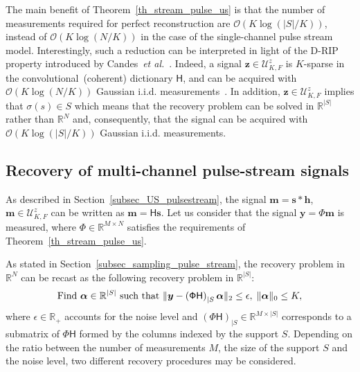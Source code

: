\documentclass{article}
\newcommand{\etal}{\textit{et al.}}
\newcommand{\vect}[1]{\bm{#1}}
\newcommand{\mat}[1]{\mathsf{#1}}
\theoremstyle{definition}
\begin{document}
The main benefit of Theorem~\ref{th_stream_pulse_us} is that the number of measurements required for perfect reconstruction are $\mathcal{O}\left(K \log \left(|S|/K\right)\right)$, instead of $\mathcal{O}\left(K \log \left(N/K\right)\right)$ in the case of the single-channel pulse stream model.
Interestingly, such a reduction can be interpreted in light of the D-RIP property introduced by Candes~\etal{}~\cite{candes11}. 
Indeed, a signal $\vect{z} \in \mathcal{U}^z_{K,F}$ is $K$-sparse in the convolutional~(coherent) dictionary $\mat{H}$, and can be acquired with $\mathcal{O} \left(K \log \left(N / K\right)\right)$ Gaussian i.i.d. measurements~\cite{candes11}. 
In addition, $\vect{z} \in \mathcal{U}^z_{K,F}$ implies that $\sigma \left(s\right) \in S$ which means that the recovery problem can be solved in $\mathbb{R}^{|S|}$ rather than $\mathbb{R}^N$ and, consequently, that the signal can be acquired with $\mathcal{O} \left(K \log \left(|S| / K\right)\right)$ Gaussian i.i.d. measurements. 

\subsection{Recovery of multi-channel pulse-stream signals}
\label{subsec_recovery_pulse_stream}
As described in Section~\ref{subsec_US_pulsestream}, the signal $\vect{m} = \vect{s} \ast \vect{h}$, $\vect{m} \in \mathcal{U}^z_{K,F}$ can be written as $\vect{m} = \mat{H} \vect{s}$. 
Let us consider that the signal $\vect{y} = \mat{\Phi} \vect{m}$ is measured, where $\mat{\Phi} \in \mathbb{R}^{M \times N}$ satisfies the requirements of Theorem~\ref{th_stream_pulse_us}. 

As stated in Section~\ref{subsec_sampling_pulse_stream}, the recovery problem in $\mathbb{R}^N$ can be recast as the following recovery problem in $\mathbb{R}^{|S|}$:
\begin{equation}
\label{eq_problem_support}
\textnormal{Find } \vect{\alpha} \in \mathbb{R}^{|S|} \textnormal{ such that } \| \vect{y} - \left(\mat{\Phi H}\right)_{|S}\vect{\alpha}\|_2 \leq \epsilon, \; \| \vect{\alpha} \|_0 \leq K, 
\end{equation}
where $\epsilon \in \mathbb{R}_{+}$ accounts for the noise level and $\left(\mat{\Phi H}\right)_{|S} \in \mathbb{R}^{M \times |S|}$ corresponds to a submatrix of $\mat{\Phi H}$ formed by the columns indexed by the support $S$. 
Depending on the ratio between the number of measurements $M$, the size of the support $S$ and the noise level, two different recovery procedures may be considered.
\end{document}
